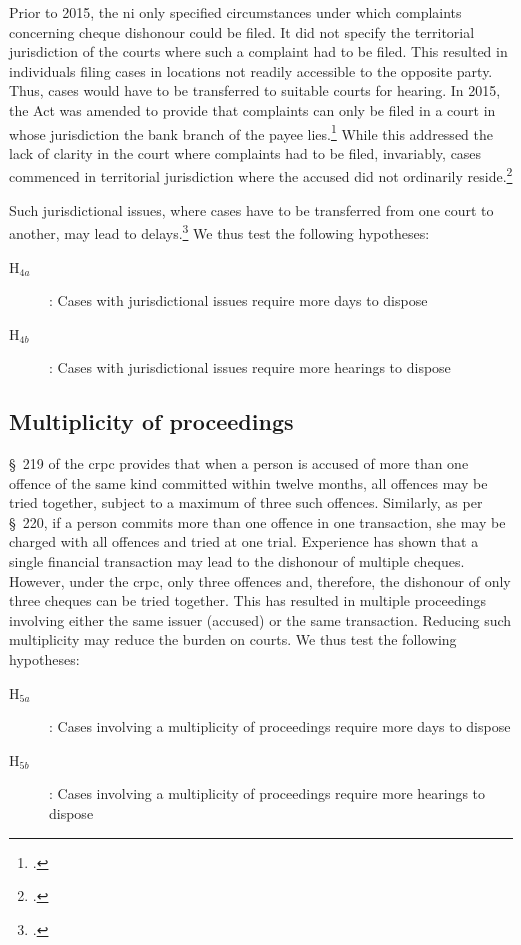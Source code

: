 Prior to 2015, the \gls{ni} only specified circumstances under which complaints concerning cheque dishonour could be filed. It did not specify the territorial jurisdiction of the courts where such a complaint had to be filed. This resulted in individuals filing cases in locations not readily accessible to the opposite party. Thus, cases would have to be transferred to suitable courts for hearing. In 2015, the Act was amended to provide that complaints can only be filed in a court in whose jurisdiction the bank branch of the payee lies.\footcite{niAmend2015} While this addressed the lack of clarity in the court where complaints had to be filed, invariably, cases commenced in territorial jurisdiction where the accused did not ordinarily reside.\footcite{amicus2020_submission}

Such jurisdictional issues, where cases have to be transferred from one court to another, may lead to delays.\footcite{sc2020_138, amicus2020_submission} We thus test the following hypotheses:

\begin{description}
\item[H$_{4a}$]: Cases with jurisdictional issues require more days to dispose
\item[H$_{4b}$]: Cases with jurisdictional issues require more hearings to dispose
\end{description}

\subsection{Multiplicity of proceedings}

\S~219 of the \gls{crpc} provides that when a person is accused of more than one offence of the same kind committed within twelve months, all offences may be tried together, subject to a maximum of three such offences. Similarly, as per \S~220, if a person commits more than one offence in one transaction, she may be charged with all offences and tried at one trial. Experience has shown that a single financial transaction may lead to the dishonour of multiple cheques. However, under the \gls{crpc}, only three offences and, therefore, the dishonour of only three cheques can be tried together. This has resulted in multiple proceedings involving either the same issuer (accused) or the same transaction. Reducing such multiplicity may reduce the burden on courts. We thus test the following hypotheses:

\begin{description}
\item[H$_{5a}$]: Cases involving a multiplicity of proceedings require more days to dispose
\item[H$_{5b}$]: Cases involving a multiplicity of proceedings require more hearings to dispose
\end{description}

